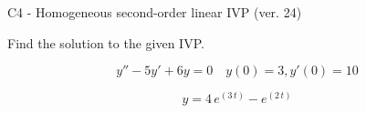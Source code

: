 \begin{exercise}
  \begin{exerciseTitle}C4 - Homogeneous second-order linear IVP (ver. 24)\end{exerciseTitle}
  \begin{exerciseStatement}
    
Find the solution to the given IVP.

    
\[y''-5y'+6y = 0 \hspace{1em} y(0) = 3 , y'(0) = 10\]

  \end{exerciseStatement}
  \begin{exerciseAnswer}
    
\[y= 4 \, e^{\left(3 \, t\right)} - e^{\left(2 \, t\right)}\]

  \end{exerciseAnswer}
\end{exercise}